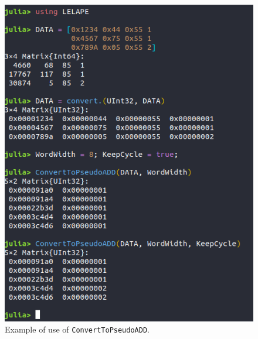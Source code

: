 \begin{itemize}
 	\begin{figure}[h!]
 		\centering
 		\includegraphics[width=0.65\columnwidth]{fig/functions/ConvertToPsudoADD.png}
 		\caption{Example of use of \texttt{ConvertToPseudoADD}.}
 		\label{fig:Example_ConvertToPseudoADD}
 	\end{figure}
 \end{itemize}
 
